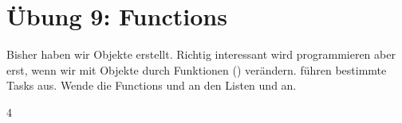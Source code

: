\documentclass[letterpaper,10pt,english]{sphinxmanual}
\begin{document}
\begin{sphinxVerbatim}[commandchars=\\\{\}]
   \PYG{p}{[}  \PYG{p}{]}  \PYG{p}{[} \PYG{p}{]}  \PYG{p}{[}  \PYG{p}{]}
\end{sphinxVerbatim}


\section{Übung 9: Functions}
\label{\detokenize{01_02_Python_Basics:ubung-9-functions}}
Bisher haben wir Objekte erstellt. Richtig interessant wird programmieren aber erst, wenn wir mit Objekte durch Funktionen () verändern.  führen bestimmte Tasks aus. Wende die Functions  und  an den Listen  und  an.

\begin{sphinxVerbatim}[commandchars=\\\{\}]
\end{sphinxVerbatim}

\begin{sphinxVerbatim}[commandchars=\\\{\}]
4
\end{sphinxVerbatim}

\begin{sphinxVerbatim}[commandchars=\\\{\}]
\end{sphinxVerbatim}
\end{document}
